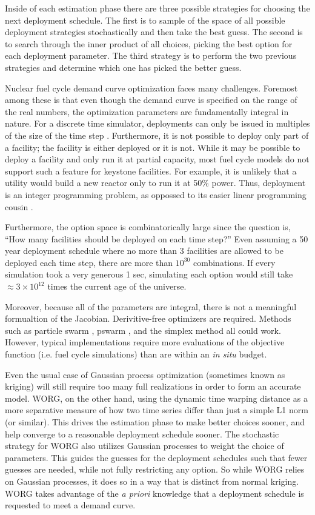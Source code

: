 Inside of each estimation phase there are three possible strategies for 
choosing the next deployment schedule.  The first is to sample of the 
space of all possible deployment strategies stochastically and then take the 
best guess.  The second is to search through the inner product of all choices,
picking the best option for each deployment parameter. The third strategy
is to perform the two previous strategies and determine which one has picked
the better guess.

Nuclear fuel cycle demand curve optimization faces many challenges. 
Foremost among these is that even though the demand curve is specified on 
the range of the real numbers, the optimization parameters are fundamentally 
integral in nature. For a discrete time simulator, deployments can only 
be issued in multiples of the size of the time step 
\cite{kelton2000simulation}. Furthermore, 
it is not possible to deploy only part of a facility; the facility is either 
deployed or it is not. While it may be possible to deploy a facility and 
only run it at partial capacity, most fuel cycle models do not support such
a feature for
keystone facilities.  For example, it is unlikely that a utility would build 
a new reactor only to run it at 50\% power. Thus, deployment is an integer 
programming problem, as oppossed to its easier linear programming cousin
\cite{vanderbei2001linear}.

Furthermore, the option space is combinatorically large since the 
question is, ``How many facilities should be deployed on each time step?'' 
Even assuming a 50 year deployment schedule where no more than 3 facilities 
are allowed to be deployed each time step, there are more than $10^30$ 
combinations. If every simulation took a very generous 1 sec, simulating 
each option would still take $\approx 3\times10^12$ times the current age
of the universe.

Moreover, because all of the parameters are integral, there is not a 
meaningful formualtion of the Jacobian. Derivitive-free optimizers are 
required. Methods such as particle swarm \citeme, pswarm \citeme, and the 
simplex method all could work.  However, typical implementations require
more evaluations of the objective function (i.e. fuel cycle simulations)
than are within an \emph{in situ} budget. 

Even the usual case of 
Gaussian process optimization (sometimes known as kriging) will still 
require too many full realizations in order to form an accurate model.
WORG, on the other hand, using the dynamic time warping distance as a 
more separative measure of how two time series differ than just a simple
L1 norm (or similar). This drives the estimation phase to make better choices
sooner, and help converge to a reasonable deployment schedule sooner. 
The stochastic strategy for WORG also utilizes Gaussian processes to 
weight the choice of parameters.  This guides the guesses for the deployment
schedules such that fewer guesses are needed, while not fully restricting 
any option.  So while WORG relies on Gaussian processes, it does so in a way
that is distinct from normal kriging. WORG
takes advantage of the \emph{a priori} knowledge that a deployment 
schedule is requested to meet a demand curve. 

